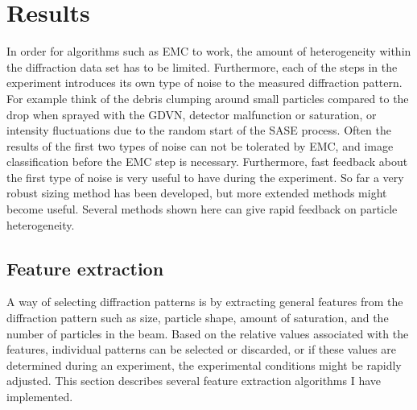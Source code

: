 \chapter{Results}
In order for algorithms such as EMC to work, the amount of heterogeneity within the diffraction data set has to be limited. Furthermore, each of the steps in the experiment introduces its own type of noise to the measured diffraction pattern. For example think of the debris clumping around small particles compared to the drop when sprayed with the GDVN, detector malfunction or saturation, or intensity fluctuations due to the random start of the SASE process. Often the results of the first two types of noise can not be tolerated by EMC, and image classification before the EMC step is necessary. Furthermore, fast feedback about the first type of noise is very useful to have during the experiment. So far a very robust sizing method has been developed, but more extended methods might become useful. Several methods shown here can give rapid feedback on particle heterogeneity.


\section{Feature extraction}
A way of selecting diffraction patterns is by extracting general features from the diffraction pattern such as size, particle shape, amount of saturation, and the number of particles in the beam. Based on the relative values associated with the features, individual patterns can be selected or discarded, or if these values are determined during an experiment, the experimental conditions might be rapidly adjusted. This section describes several feature extraction algorithms I have implemented.

